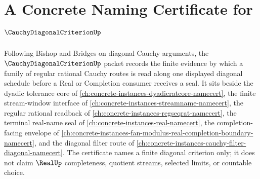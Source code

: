 \chapter{A Concrete Naming Certificate for $\CauchyDiagonalCriterionUp$}
\label{ch:concrete-instances-cauchy-diagonal-criterion-namecert}

Following Bishop and Bridges on diagonal Cauchy arguments, the $\CauchyDiagonalCriterionUp$ packet records the finite evidence by which a family of regular rational Cauchy routes is read along one displayed diagonal schedule before a Real or Completion consumer receives a seal. It sits beside the dyadic tolerance core of \autoref{ch:concrete-instances-dyadicratcore-namecert}, the finite stream-window interface of \autoref{ch:concrete-instances-streamname-namecert}, the regular rational readback of \autoref{ch:concrete-instances-regseqrat-namecert}, the terminal real-name seal of \autoref{ch:concrete-instances-real-namecert}, the completion-facing envelope of \autoref{ch:concrete-instances-fan-modulus-real-completion-boundary-namecert}, and the diagonal filter route of \autoref{ch:concrete-instances-cauchy-filter-diagonal-namecert}. The certificate names a finite diagonal criterion only; it does not claim $\RealUp$ completeness, quotient streams, selected limits, or countable choice.

